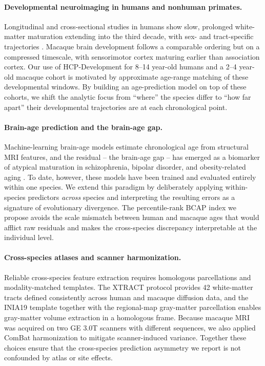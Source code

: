 \paragraph{Developmental neuroimaging in humans and nonhuman primates.}
Longitudinal and cross-sectional studies in humans show slow, prolonged white-matter maturation extending into the third decade, with sex- and tract-specific trajectories \cite{dubois2014early, perrin2009sex, miller2012prolonged}. Macaque brain development follows a comparable ordering but on a compressed timescale, with sensorimotor cortex maturing earlier than association cortex. Our use of HCP-Development \cite{somerville2018lifespan, harms2018extending} for 8--14 year-old humans and a 2--4 year-old macaque cohort is motivated by approximate age-range matching of these developmental windows. By building an age-prediction model on top of these cohorts, we shift the analytic focus from ``where'' the species differ to ``how far apart'' their developmental trajectories are at each chronological point.

\paragraph{Brain-age prediction and the brain-age gap.}
Machine-learning brain-age models estimate chronological age from structural MRI features, and the residual -- the brain-age gap -- has emerged as a biomarker of atypical maturation in schizophrenia, bipolar disorder, and obesity-related aging \cite{cole2017predicting, franke2010estimating, hajek2019brain, mcwhinney2021obesity}. To date, however, these models have been trained and evaluated entirely within one species. We extend this paradigm by deliberately applying within-species predictors \textit{across} species and interpreting the resulting errors as a signature of evolutionary divergence. The percentile-rank BCAP index we propose avoids the scale mismatch between human and macaque ages that would afflict raw residuals and makes the cross-species discrepancy interpretable at the individual level.

\paragraph{Cross-species atlases and scanner harmonization.}
Reliable cross-species feature extraction requires homologous parcellations and modality-matched templates. The XTRACT protocol \cite{warrington2020xtract} provides 42 white-matter tracts defined consistently across human and macaque diffusion data, and the INIA19 template \cite{rohlfing2012inia19} together with the regional-map gray-matter parcellation \cite{bezgin2012hierarchical} enables gray-matter volume extraction in a homologous frame. Because macaque MRI was acquired on two GE 3.0T scanners with different sequences, we also applied ComBat harmonization \cite{johnson2007adjusting, fortin2017harmonization_dti, fortin2017harmonization_thickness} to mitigate scanner-induced variance. Together these choices ensure that the cross-species prediction asymmetry we report is not confounded by atlas or site effects.
